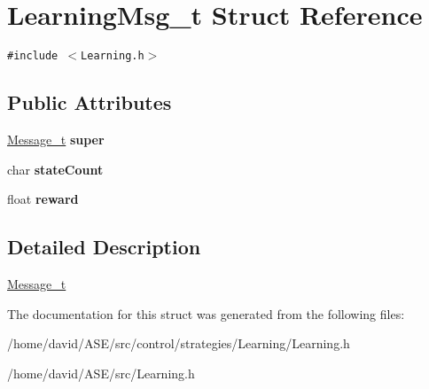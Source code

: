 \hypertarget{structLearningMsg__t}{
\section{LearningMsg\_\-t Struct Reference}
\label{structLearningMsg__t}
}
{\tt \#include $<$Learning.h$>$}

\subsection*{Public Attributes}
\begin{CompactItemize}
\item 
\hypertarget{structLearningMsg__t_78c17600483af8976973352965e78344}{
\hyperlink{structMessage__t}{Message\_\-t} \textbf{super}}
\label{structLearningMsg__t_78c17600483af8976973352965e78344}

\item 
\hypertarget{structLearningMsg__t_bfc2af7d9f2e42f0553a17d90842b7cd}{
char \textbf{stateCount}}
\label{structLearningMsg__t_bfc2af7d9f2e42f0553a17d90842b7cd}

\item 
\hypertarget{structLearningMsg__t_dcdd80f5f5895397a8d452b9aa875aa0}{
float \textbf{reward}}
\label{structLearningMsg__t_dcdd80f5f5895397a8d452b9aa875aa0}

\end{CompactItemize}


\subsection{Detailed Description}
\hyperlink{structMessage__t}{Message\_\-t} 

The documentation for this struct was generated from the following files:\begin{CompactItemize}
\item 
/home/david/ASE/src/control/strategies/Learning/Learning.h\item 
/home/david/ASE/src/Learning.h\end{CompactItemize}
